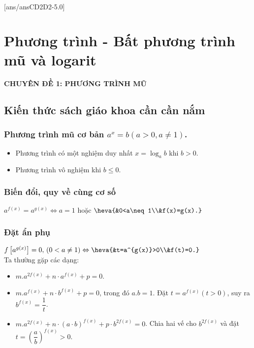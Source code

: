 [ans/ansCD2D2-5.0]
\section{Phương trình - Bất phương trình mũ và logarit}
\begin{center}
	\textbf{CHUYÊN ĐỀ 1: PHƯƠNG TRÌNH MŨ}
\end{center}
\subsection{Kiến thức sách giáo khoa cần cần nắm}
\subsubsection{Phương trình mũ cơ bản $a^x=b\left(a>0, a\neq 1\right)$.}
\begin{itemize}
	\item Phương trình có một nghiệm duy nhất $x=\log_ab$ khi $b>0$.
	\item Phương trình vô nghiệm khi $b\leq 0$.
\end{itemize}
\subsubsection{Biến đổi, quy về cùng cơ số}
$a^{f(x)}=a^{g(x)}\Leftrightarrow a=1$ hoặc $\heva{&0<a\neq 1\\&f(x)=g(x).}$ \\
\subsubsection{Đặt ẩn phụ}
$f\left[a^{g(x)}\right]=0,\,(0<a\neq 1)\Leftrightarrow\heva{&t=a^{g(x)}>0\\&f(t)=0.}$ \\
Ta thường gặp các dạng:
\begin{itemize}
	\item $m.a^{2f(x)}+n\cdot a^{f(x)}+p=0$.
	\item $m.a^{f(x)}+n\cdot b^{f(x)}+p=0$, trong đó $a.b=1$. Đặt $t=a^{f(x)}(t>0)$, suy ra $b^{f(x)}=\dfrac{1}{t}$.
	\item $m.a^{2f(x)}+n\cdot (a\cdot b)^{f(x)}+p\cdot b^{2f(x)}=0$. Chia hai vế cho $b^{2f(x)}$ và đặt $t=\left(\dfrac{a}{b}\right)^{f(x)}>0$.
\end{itemize}
